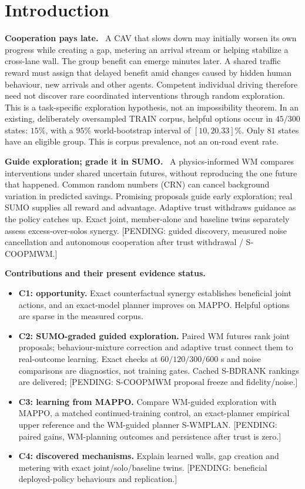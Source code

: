 \documentclass[conference]{IEEEtran}
\newcommand{\pending}[1]{\textcolor{red!80!black}{[PENDING: #1]}}
\newcommand{\para}[1]{\noindent\textbf{#1}\ }
\begin{document}
\section{Introduction}
\para{Cooperation pays late.}
A CAV that slows down may initially worsen its own progress while creating a
gap, metering an arrival stream or helping stabilize a cross-lane wall.
The group benefit can emerge minutes later. A shared traffic reward must
assign that delayed benefit amid changes caused by hidden human behaviour,
new arrivals and other agents. Competent individual driving therefore need
not discover rare coordinated interventions through random exploration.
This is a task-specific exploration hypothesis, not an impossibility theorem.
In an existing, deliberately oversampled TRAIN corpus, helpful options occur in
$45/300$ states: $15\%$, with a $95\%$ world-bootstrap interval of
$[10,20.33]\%$. Only $81$ states have an eligible group.
This is corpus prevalence, not an on-road event rate.

\para{Guide exploration; grade it in SUMO.}
A physics-informed WM compares interventions under shared uncertain futures,
without reproducing the one future that happened. Common random numbers (CRN)
can cancel background variation in predicted savings. Promising proposals
guide early exploration; real SUMO supplies all reward and advantage.
Adaptive trust withdraws guidance as the policy catches up. Exact joint,
member-alone and baseline twins separately assess excess-over-solos synergy.
\pending{guided discovery, measured noise cancellation and autonomous
cooperation after trust withdrawal / S-COOPMWM.}

\para{Contributions and their present evidence status.}
\begin{itemize}
\item \textbf{C1: opportunity.} Exact counterfactual synergy establishes
beneficial joint actions, and an exact-model planner improves on MAPPO.
Helpful options are sparse in the measured corpus.
\item \textbf{C2: SUMO-graded guided exploration.} Paired WM futures rank
joint proposals; behaviour-mixture correction and adaptive trust connect them
to real-outcome learning.
Exact checks at $60/120/300/600$ s and noise comparisons are diagnostics,
not training gates. Cached S-BDRANK rankings are delivered;
\pending{S-COOPMWM proposal freeze and fidelity/noise.}
\item \textbf{C3: learning from MAPPO.} Compare WM-guided exploration with
MAPPO, a matched continued-training control, an exact-planner empirical upper
reference and the WM-guided planner S-WMPLAN.
\pending{paired gains, WM-planning outcomes and persistence after trust is zero.}
\item \textbf{C4: discovered mechanisms.} Explain learned walls, gap creation
and metering with exact joint/solo/baseline twins.
\pending{beneficial deployed-policy behaviours and replication.}
\end{itemize}
\end{document}
